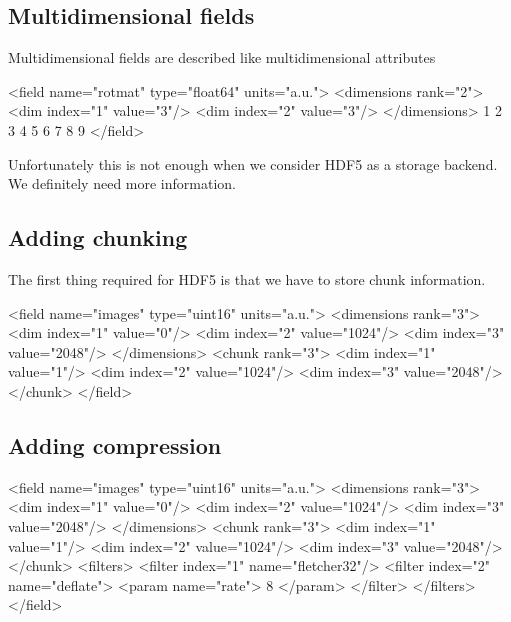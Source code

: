 \subsection{Multidimensional fields}

Multidimensional fields are described like multidimensional attributes 
\begin{xmlcode}
<field name="rotmat" type="float64" units="a.u.">
    <dimensions rank="2">
        <dim index="1" value="3"/>
        <dim index="2" value="3"/>
    </dimensions>
    1 2 3
    4 5 6
    7 8 9
</field>
\end{xmlcode}
Unfortunately this is not enough when we consider HDF5 as a storage backend. 
We definitely need more information.

\subsection{Adding chunking}

The first thing required for HDF5 is that we have to store chunk information. 
\begin{xmlcode}
<field name="images" type="uint16" units="a.u.">
    <dimensions rank="3">
        <dim index="1" value="0"/>
        <dim index="2" value="1024"/>
        <dim index="3" value="2048"/>
    </dimensions>
    <chunk rank="3">
        <dim index="1" value="1"/>
        <dim index="2" value="1024"/>
        <dim index="3" value="2048"/>
    </chunk>
</field>
\end{xmlcode}

\subsection{Adding compression}

\begin{xmlcode}
<field name="images" type="uint16" units="a.u.">
    <dimensions rank="3">
        <dim index="1" value="0"/>
        <dim index="2" value="1024"/>
        <dim index="3" value="2048"/>
    </dimensions>
    <chunk rank="3">
        <dim index="1" value="1"/>
        <dim index="2" value="1024"/>
        <dim index="3" value="2048"/>
    </chunk>
    <filters>
        <filter index="1" name="fletcher32"/>
        <filter index="2" name="deflate">
            <param name="rate"> 8 </param>
        </filter>
    </filters>
</field>
\end{xmlcode}

